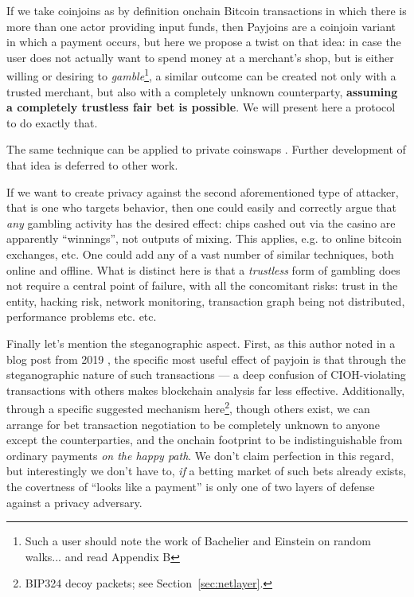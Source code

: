 \documentclass[11pt]{article}
\begin{document}
If we take coinjoins \cite{maxwell2013} as by definition onchain Bitcoin transactions in which there is more than one actor providing input funds, then Payjoins are a coinjoin variant in which a payment occurs, but here we propose a twist on that idea: in case the user does not actually want to spend money at a merchant's shop, but is either willing or desiring to \emph{gamble}\footnote{Such a user should note the work of Bachelier and Einstein on random walks... and read Appendix B}, a similar outcome can be created not only with a trusted merchant, but also with a completely unknown counterparty, \textbf{assuming a completely trustless fair bet is possible}. We will present here a protocol to do exactly that.

The same technique can be applied to private coinswaps \cite{coinswap}. Further development of that idea is deferred to other work.

If we want to create privacy against the second aforementioned type of attacker, that is one who targets behavior, then one could easily and correctly argue that \emph{any} gambling activity has the desired effect: chips cashed out via the casino are apparently ``winnings'', not outputs of mixing. This applies, e.g. to online bitcoin exchanges, etc. One could add any of a vast number of similar techniques, both online and offline. What is distinct here is that a \emph{trustless} form of gambling does not require a central point of failure, with all the concomitant risks: trust in the entity, hacking risk, network monitoring, transaction graph being not distributed, performance problems etc. etc.

Finally let's mention the steganographic aspect. First, as this author noted in a blog post from 2019 \cite{payjoinblog}, the specific most useful effect of payjoin is that through the steganographic nature of such transactions --- a deep confusion of CIOH-violating transactions with others makes blockchain analysis far less effective. Additionally, through a specific suggested mechanism here\footnote{BIP324 \cite{bip324} decoy packets; see Section~\ref{sec:netlayer}.}, though others exist, we can arrange for bet transaction negotiation to be completely unknown to anyone except the counterparties, and the onchain footprint to be indistinguishable from ordinary payments \emph{on the happy path}. We don't claim perfection in this regard, but interestingly we don't have to, \emph{if} a betting market of such bets already exists, the covertness of ``looks like a payment'' is only one of two layers of defense against a privacy adversary.
\end{document}
